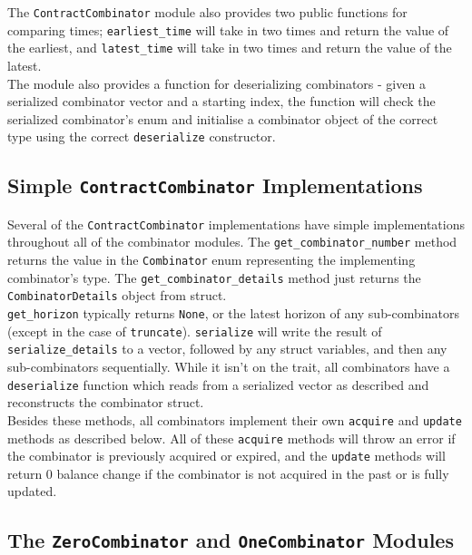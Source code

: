 The \texttt{ContractCombinator} module also provides two public functions for comparing times; \texttt{earliest\_time} will take in two times and return the value of the earliest, and \texttt{latest\_time} will take in two times and return the value of the latest. \\

The module also provides a function for deserializing combinators - given a serialized combinator vector and a starting index, the function will check the serialized combinator's enum and initialise a combinator object of the correct type using the correct \texttt{deserialize} constructor.


\subsection{Simple \texttt{ContractCombinator} Implementations}

Several of the \texttt{ContractCombinator} implementations have simple implementations throughout all of the combinator modules. The \texttt{get\_combinator\_number} method returns the value in the \texttt{Combinator} enum representing the implementing combinator's type. The \texttt{get\_combinator\_details} method just returns the \texttt{CombinatorDetails} object from struct. \\

\texttt{get\_horizon} typically returns \texttt{None}, or the latest horizon of any sub-combinators (except in the case of \texttt{truncate}). \texttt{serialize} will write the result of \texttt{serialize\_details} to a vector, followed by any struct variables, and then any sub-combinators sequentially. While it isn't on the trait, all combinators have a \texttt{deserialize} function which reads from a serialized vector as described and reconstructs the combinator struct. \\

Besides these methods, all combinators implement their own \texttt{acquire} and \texttt{update} methods as described below. All of these \texttt{acquire} methods will throw an error if the combinator is previously acquired or expired, and the \texttt{update} methods will return 0 balance change if the combinator is not acquired in the past or is fully updated.


\subsection{The \texttt{ZeroCombinator} and \texttt{OneCombinator} Modules}

